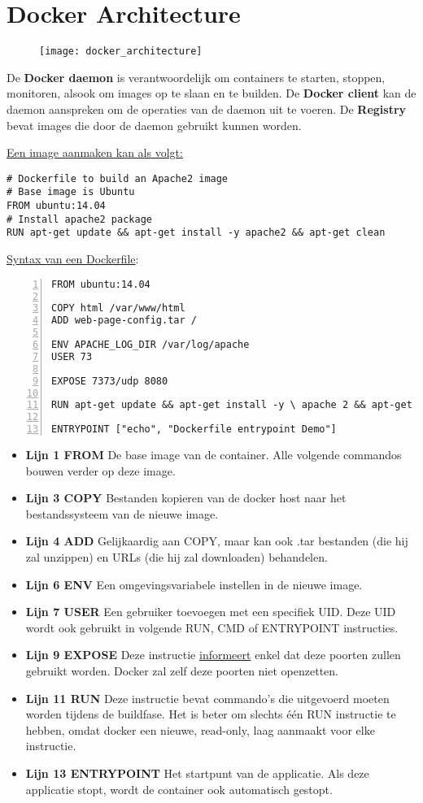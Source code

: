	\section{Docker Architecture}
	\begin{figure}[ht]
		\texttt{[image: docker\_architecture]}
	\end{figure}
	De \textbf{Docker daemon} is verantwoordelijk om containers te starten, stoppen, monitoren, alsook om images op te slaan en te builden. De \textbf{Docker client} kan de daemon aanspreken om de operaties van de daemon uit te voeren. De \textbf{Registry} bevat images die door de daemon gebruikt kunnen worden.

	\underline{Een image aanmaken kan als volgt:}
	\begin{lstlisting}
# Dockerfile to build an Apache2 image
# Base image is Ubuntu
FROM ubuntu:14.04
# Install apache2 package
RUN apt-get update && apt-get install -y apache2 && apt-get clean
	\end{lstlisting}

	\underline{Syntax van een Dockerfile}:
	\begin{lstlisting}[numbers=left]
FROM ubuntu:14.04

COPY html /var/www/html
ADD web-page-config.tar /

ENV APACHE_LOG_DIR /var/log/apache
USER 73

EXPOSE 7373/udp 8080

RUN apt-get update && apt-get install -y \ apache 2 && apt-get clean

ENTRYPOINT ["echo", "Dockerfile entrypoint Demo"]
	\end{lstlisting}
	\begin{itemize}
		\item[\info] \textbf{Lijn 1 FROM} De base image van de container. Alle volgende commandos bouwen verder op deze image. 
		\item[\info] \textbf{Lijn 3 COPY} Bestanden kopieren van de docker host naar het bestandssysteem van de nieuwe image.
		\item[\info] \textbf{Lijn 4 ADD} Gelijkaardig aan COPY, maar kan ook .tar bestanden (die hij zal unzippen) en URLs (die hij zal downloaden) behandelen.
		\item[\info] \textbf{Lijn 6 ENV} Een omgevingsvariabele instellen in de nieuwe image.
		\item[\info] \textbf{Lijn 7 USER} Een gebruiker toevoegen met een specifiek UID. Deze UID wordt ook gebruikt in volgende RUN, CMD of ENTRYPOINT instructies.
		\item[\info] \textbf{Lijn 9 EXPOSE} Deze instructie \underline{informeert} enkel dat  deze poorten zullen gebruikt worden. Docker zal zelf deze poorten niet openzetten.
		\item[\info] \textbf{Lijn 11 RUN} Deze instructie bevat commando's die uitgevoerd moeten worden tijdens de buildfase. Het is beter om slechts één RUN instructie te hebben, omdat docker een nieuwe, read-only, laag aanmaakt voor elke instructie.
		\item[\info] \textbf{Lijn 13 ENTRYPOINT} Het startpunt van de applicatie. Als deze applicatie stopt, wordt de container ook automatisch gestopt.
	\end{itemize}

